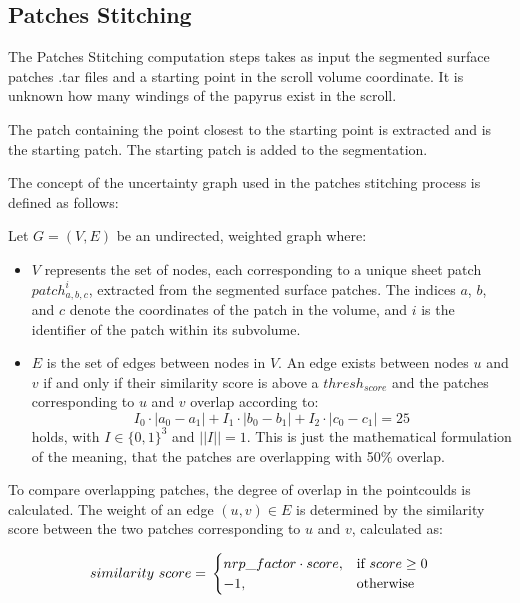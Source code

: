 \documentclass[peerreview]{IEEEtran}
\begin{document}
\subsection{Patches Stitching}
The Patches Stitching computation steps takes as input the segmented surface patches .tar files and a starting point in the scroll volume coordinate. It is unknown how many windings of the papyrus exist in the scroll.

The patch containing the point closest to the starting point is extracted and is the starting patch. The starting patch is added to the segmentation. 

The concept of the uncertainty graph used in the patches stitching process is defined as follows:

Let \(G = (V, E)\) be an undirected, weighted graph where:

\begin{itemize}
    \item \(V\) represents the set of nodes, each corresponding to a unique sheet patch \(patch^i_{a, b, c}\), extracted from the segmented surface patches. The indices \(a\), \(b\), and \(c\) denote the coordinates of the patch in the volume, and \(i\) is the identifier of the patch within its subvolume.
    \item \(E\) is the set of edges between nodes in \(V\). An edge exists between nodes \(u\) and \(v\) if and only if their similarity score is above a $thresh_{score}$ and the patches corresponding to \(u\) and \(v\) overlap according to:
    \[
    I_0 \cdot \lvert a_0-a_1 \rvert + I_1 \cdot \lvert b_0-b_1 \rvert + I_2 \cdot \lvert c_0-c_1 \rvert = 25
    \]
    holds, with \(I\in \{0, 1\}^3\) and \(||I|| = 1\). This is just the mathematical formulation of the meaning, that the patches are overlapping with 50\% overlap.
    
\end{itemize}

To compare overlapping patches, the degree of overlap in the pointcoulds is calculated. The weight of an edge \((u, v) \in E\) is determined by the similarity score between the two patches corresponding to \(u\) and \(v\), calculated as:

\[
similarity\ score = \\
\begin{cases}
    nrp\_factor \cdot score,& \text{if } score\geq 0 \\
    -1,             & \text{otherwise}
\end{cases}
\]
\end{document}
